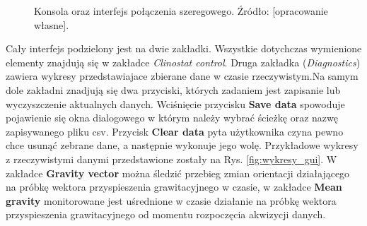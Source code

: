 \begin{figure}[h]
	
	\centering
	\setlength{\fboxsep}{0pt}
	\setlength{\fboxrule}{1pt}
	\caption{Konsola oraz interfejs połączenia szeregowego. Źródło: [opracowanie własne].} 
	\label{fig:konsola_gui}
	
\end{figure}

Cały interfejs podzielony jest na dwie zakładki. Wszystkie dotychczas wymienione elementy znajdują się w zakładce \textit{Clinostat control}. Druga zakładka (\textit{Diagnostics}) zawiera wykresy przedstawiajace zbierane dane w czasie rzeczywistym.\linebreak Na samym dole zakładni znadjują się dwa przyciski, których zadaniem jest zapisanie lub wyczyszczenie aktualnych danych. Wciśnięcie przycisku \textbf{Save data} spowoduje pojawienie się okna dialogowego w którym należy wybrać ścieżkę oraz nazwę zapisywanego pliku csv. Przycisk \textbf{Clear data} pyta użytkownika czy\linebreak na pewno chce usunąć zebrane dane, a następnie wykonuje jego wolę. Przykładowe wykresy z rzeczywistymi danymi przedstawione zostały na Rys. \ref{fig:wykresy_gui}. W zakładce \textbf{Gravity vector} można śledzić przebieg zmian orientacji działającego na próbkę wektora przyspieszenia grawitacyjnego w czasie, w zakładce \textbf{Mean gravity} monitorowane jest uśrednione w czasie działanie na próbkę wektora przyspieszenia grawitacyjnego od momentu rozpoczęcia akwizycji danych.

